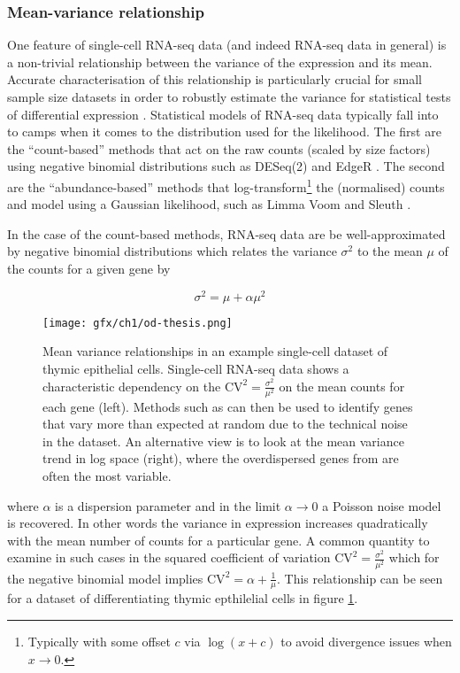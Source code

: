 \subsubsection{Mean-variance relationship}

One feature of single-cell RNA-seq data (and indeed RNA-seq data in general) is a non-trivial relationship between the variance of the expression and its mean. Accurate characterisation of this relationship is particularly crucial for small sample size datasets in order to robustly estimate the variance for statistical tests of differential expression \cite{Robinson2010-rj}. Statistical models of RNA-seq data typically fall into to camps when it comes to the distribution used for the likelihood. The first are the ``count-based'' methods  that act on the raw counts (scaled by size factors) using negative binomial distributions such as DESeq(2) and EdgeR \cite{Anders2010,Robinson2010-rj}. The second are the ``abundance-based'' methods  that log-transform\footnote{
Typically with some offset $c$ via $\log(x+c)$ to avoid divergence issues when $x \rightarrow 0$.
} the (normalised) counts and model using a Gaussian likelihood, such as Limma Voom and Sleuth \cite{Law2014-tu,Pimentel2016-xz}.

In the case of the count-based methods, RNA-seq data are  be well-approximated by negative binomial distributions \cite{Anders2010,Robinson2010-rj,Risso2017-qk} which relates the variance $\sigma^2$ to the mean $\mu$ of the counts for a given gene by

\begin{equation}
  \sigma^2 = \mu + \alpha \mu^2
\end{equation}

\begin{figure}
\centering
  \texttt{[image: gfx/ch1/od-thesis.png]}
  \caption{Mean variance relationships in an example single-cell dataset of thymic epithelial cells. Single-cell RNA-seq data shows a characteristic dependency on the $\text{CV}^2 = \frac{\sigma^2}
{\mu^2}$ on the mean counts for each gene (left). Methods such as \cite{Brennecke2013-xy} can then be used to identify genes that vary more than expected at random due to the technical noise in the dataset. An alternative view is to look at the mean variance trend in log space (right), where the overdispersed genes from \cite{Brennecke2013-xy} are often the most variable.} \label{fig:od}
\end{figure}


where $\alpha$ is a dispersion parameter and in the limit $\alpha \rightarrow 0$ a Poisson noise model is recovered. In other words the variance in expression increases quadratically with the mean number of counts for a particular gene. A common quantity to examine in such cases in the squared coefficient of variation $\text{CV}^2 = \frac{\sigma^2}{\mu^2}$ which for the negative binomial model implies $\text{CV}^2 = \alpha + \frac{1}{\mu}$. This relationship can be seen for a dataset of differentiating thymic epthilelial cells in figure \ref{fig:od}.

